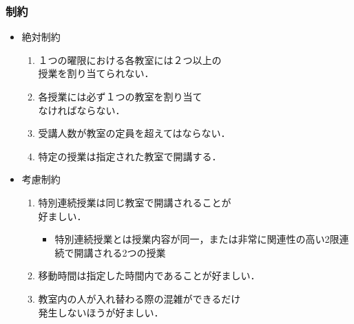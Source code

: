 \documentclass[dvipdfmx,12pt]{beamer}
\begin{document}
\begin{frame}
  \frametitle{\LARGE 制約}
\begin{itemize}
\item{絶対制約}
  \begin{enumerate}
  \item {\large １つの曜限における各教室には２つ以上の\\授業を割り当てられない．}
  \item {\large 各授業には必ず１つの教室を割り当て\\なければならない．}
  \item {\large 受講人数が教室の定員を超えてはならない．}
  \item {\large 特定の授業は指定された教室で開講する．}
  \end{enumerate}
\item{考慮制約}
  \begin{enumerate}
  \item {\large 特別連続授業は同じ教室で開講されることが\\好ましい．}
	\begin{itemize}
	\item{\large{特別連続授業とは授業内容が同一，または非常に関連性の高い2限連続で開講される2つの授業}}
	\end{itemize}
  \item {\large 移動時間は指定した時間内であることが好ましい．}
  \item {\large 教室内の人が入れ替わる際の混雑ができるだけ\\ 発生しないほうが好ましい．}
  \end{enumerate}
\end{itemize}
\end{frame}
\end{document}
